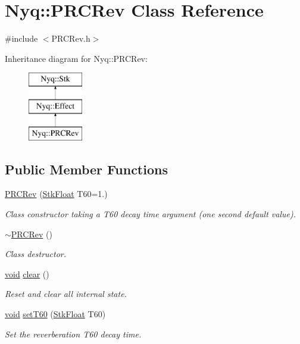 \hypertarget{class_nyq_1_1_p_r_c_rev}{}\section{Nyq\+:\+:P\+R\+C\+Rev Class Reference}
\label{class_nyq_1_1_p_r_c_rev}


{\ttfamily \#include $<$P\+R\+C\+Rev.\+h$>$}

Inheritance diagram for Nyq\+:\+:P\+R\+C\+Rev\+:\begin{figure}[H]
\begin{center}
\leavevmode
\includegraphics[height=3.000000cm]{class_nyq_1_1_p_r_c_rev}
\end{center}
\end{figure}
\subsection*{Public Member Functions}
\begin{DoxyCompactItemize}
\item 
\hyperlink{class_nyq_1_1_p_r_c_rev_aef778e9621871e976a2c780c8dc959ab}{P\+R\+C\+Rev} (\hyperlink{namespace_nyq_a044fa20a706520a617bbbf458a7db7e4}{Stk\+Float} T60=1.)
\begin{DoxyCompactList}\small\item\em Class constructor taking a T60 decay time argument (one second default value). \end{DoxyCompactList}\item 
\hyperlink{class_nyq_1_1_p_r_c_rev_a84c4e24782fd1a72731639f6d7b655a3}{$\sim$\+P\+R\+C\+Rev} ()
\begin{DoxyCompactList}\small\item\em Class destructor. \end{DoxyCompactList}\item 
\hyperlink{sound_8c_ae35f5844602719cf66324f4de2a658b3}{void} \hyperlink{class_nyq_1_1_p_r_c_rev_ad48c58d0a5cef3d60494658a80165dfc}{clear} ()
\begin{DoxyCompactList}\small\item\em Reset and clear all internal state. \end{DoxyCompactList}\item 
\hyperlink{sound_8c_ae35f5844602719cf66324f4de2a658b3}{void} \hyperlink{class_nyq_1_1_p_r_c_rev_a043e12941fb8fd657e0511e7afe85cbc}{set\+T60} (\hyperlink{namespace_nyq_a044fa20a706520a617bbbf458a7db7e4}{Stk\+Float} T60)
\begin{DoxyCompactList}\small\item\em Set the reverberation T60 decay time. \end{DoxyCompactList}\end{DoxyCompactItemize}
